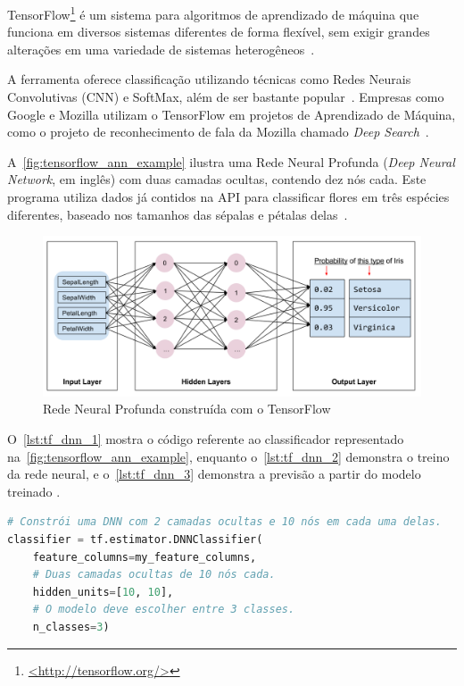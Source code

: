 TensorFlow\footnote{\href{http://tensorflow.org/}{<http://tensorflow.org/>}} é um sistema para algoritmos de aprendizado de máquina que funciona em diversos sistemas diferentes de forma flexível, sem exigir grandes alterações em uma variedade de sistemas heterogêneos~\cite{abadi:2016}.

A ferramenta oferece classificação utilizando técnicas como Redes Neurais Convolutivas (CNN) e SoftMax, além de ser bastante popular~\cite{ertram:2017}. Empresas como Google e Mozilla utilizam o TensorFlow em projetos de Aprendizado de Máquina, como o projeto de reconhecimento de fala da Mozilla chamado \textit{Deep Search}~\cite{tensorflow:uses}.

A~\autoref{fig:tensorflow_ann_example} ilustra uma Rede Neural Profunda (\textit{Deep Neural Network}, em inglês) com duas camadas ocultas, contendo dez nós cada. Este programa utiliza dados já contidos na API para classificar flores em três espécies diferentes, baseado nos tamanhos das sépalas e pétalas delas~\cite{tensorflow:premade_estimators}.

\begin{figure}[ht]
	\caption{\label{fig:tensorflow_ann_example}Rede Neural Profunda construída com o TensorFlow}
	\begin{center}
	    \includegraphics[width=\textwidth]{resources/tensorflow_ann_example}
	\end{center}
\end{figure}

O~\autoref{lst:tf_dnn_1} mostra o código referente ao classificador representado na~\autoref{fig:tensorflow_ann_example}, enquanto o~\autoref{lst:tf_dnn_2} demonstra o treino da rede neural, e o~\autoref{lst:tf_dnn_3} demonstra a previsão a partir do modelo treinado \cite{tensorflow:premade_estimators}.

\begin{lstlisting}[language=Python,caption={Inicializando o classificador no TensorFlow},label={lst:tf_dnn_1}]
# Constrói uma DNN com 2 camadas ocultas e 10 nós em cada uma delas.
classifier = tf.estimator.DNNClassifier(
	feature_columns=my_feature_columns,
	# Duas camadas ocultas de 10 nós cada.
	hidden_units=[10, 10],
	# O modelo deve escolher entre 3 classes.
	n_classes=3)
\end{lstlisting}


